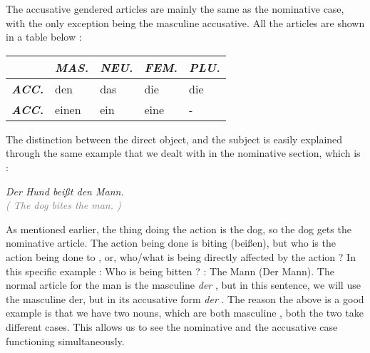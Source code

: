 \documentclass[a4paper,twocolumn,10pt]{article}
\newcommand{\newpar}
{\par \vspace{0.3cm}}
\begin{document}
The accusative gendered articles are mainly the same as the nominative case,
with the only exception being the masculine accusative. All the articles are
shown in a table below :


\nolinenumbers
\vspace{0.5cm}
\begin{tabularx}{0.94\linewidth}{l|XXXX}

		&
		\cellcolor{table-subtopic} \textbf{\textit{MAS.}} &
		\cellcolor{table-subtopic} \textbf{\textit{NEU.}}  &
		\cellcolor{table-subtopic} \textbf{\textit{FEM.}}  &
		\cellcolor{table-subtopic} \textbf{\textit{PLU.}} \\
		\midrule

		\cellcolor{table-subtopic} \textbf{\textit{ACC.}} &
		\cellcolor{cell-lightgreen} den              &
		\cellcolor{cell-lightorange}  das            &
		\cellcolor{cell-lightblue}  die              &
		\cellcolor{cell-lightblue} die \\

		\midrule

		\cellcolor{table-subtopic} \textbf{\textit{ACC.}} &
\cellcolor{cell-lightgreen} einen            &
\cellcolor{cell-lightorange}  ein            &
\cellcolor{cell-lightblue}  eine             &
\cellcolor{table-bg} - \\


\end{tabularx}

\vspace{0.5cm}

\linenumbers


The distinction between the direct object, and the subject is easily explained
through the same example that we dealt with in the nominative section, which is
:\newpar

\noindent
\textit{Der Hund beißt den Mann.}\\
\textcolor{gray} { \textit{( The dog bites the man. )} } \newpar

As mentioned earlier, the thing doing the action is the dog, so the dog gets the
nominative article. The action being done is biting (beißen), but who is the
action being done to , or, who/what is being directly affected by the action ?
In this specific example : Who is being bitten ? : The Mann (Der Mann). The
normal article for the man is the masculine \textit{der} , but in this sentence,
we will use the masculine der, but in its accusative form \textit{der} . The
reason the above is a good example is that we have two nouns, which are both
masculine , both the two take different cases. This allows us to see the
nominative and the accusative case functioning simultaneously.\newpar
\end{document}
